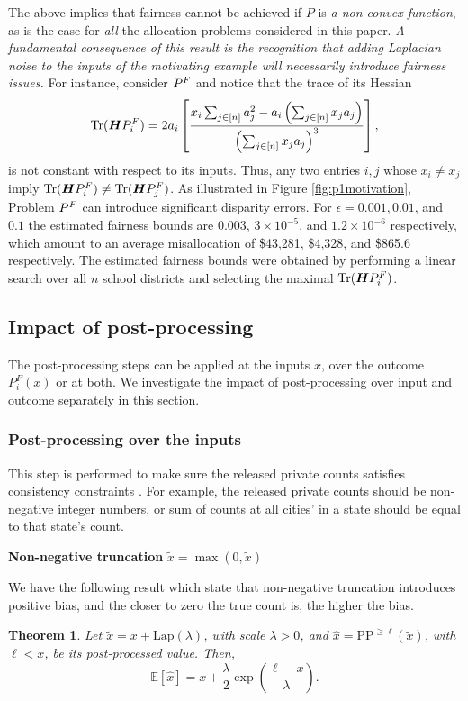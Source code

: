 \documentclass[9pt,twocolumn,twoside,lineno]{pnas-new}
\newcommand{\EE}{\mathbb{E}} \newcommand{\RR}{\mathbb{R}}
\newtheorem{theorem}{Theorem}
\begin{document}
\noindent
The above implies that fairness cannot be achieved if $P$ is \emph{a
  non-convex function}, as is the case for \emph{all} the allocation
problems considered in this paper. {\em A fundamental consequence of
  this result is the recognition that adding Laplacian noise to the
  inputs of the motivating example will necessarily introduce fairness
  issues.} For instance, consider $P^F$ and notice that the trace of
its Hessian
\[
\mbox{Tr}(\bm{H}P^F_i) = 2a_i \left[
\frac{x_i \sum_{j\in[n]} a_j^2 - a_i \left(\sum_{j\in[n]} x_ja_j\right)}
     {\left(\sum_{j\in[n]}x_ja_j\right)^3}
\right],
\]
is not constant with respect to its inputs. Thus, any two entries $i,
j$ whose $x_i \neq x_j$ imply $\mbox{Tr}(\bm{H}P^F_i) \neq
\mbox{Tr}(\bm{H}P^F_j)$.  As illustrated in Figure \ref{fig:p1motivation},
Problem $P^F$ can introduce significant disparity errors.  For $\epsilon = 0.001,
0.01$, and $0.1$ the estimated fairness bounds are $0.003$, $3\times
10^{-5}$, and $1.2\times 10^{-6}$ respectively, which amount to an
average misallocation of \$43,281, \$4,328, and \$865.6 respectively.
The estimated fairness bounds were obtained by performing a linear
search over all $n$ school districts and selecting the maximal
$\mbox{Tr}(\bm{H}P^F_i)$.


\subsection*{Impact of post-processing}
The post-processing steps can be applied at the inputs $x$, over the outcome $P^F_{i}(x)$ or at both. We investigate the impact of post-processing over input and outcome separately in this section.


\subsubsection*{Post-processing over the inputs}
This step is performed to make sure the released private counts satisfies consistency constraints \cite{cohen2021census}. For example, the released private counts should be non-negative integer numbers, or sum of counts at all cities' in a state should be equal to that state's count. 


\noindent \textbf{Non-negative truncation} $\tilde{x} = \max(0, \tilde{x}) $

We have the following result which state that non-negative truncation introduces positive bias, and the closer to zero the true count is, the higher the bias. 
\begin{theorem}
  \label{lem:exp_clipped_lap}
  Let $\tilde{x} = x + \mbox{Lap}(\lambda)$, with scale $\lambda > 0$, 
  and $\hat{x} = \text{PP}^{\geq \ell}(\tilde{x})$, with $\ell < x$, 
  be its post-processed value. Then, 
  $$ 
    \EE[\hat{x}] = x + \frac{\lambda}{2} \exp(\frac{\ell - x}{\lambda} ).
  $$
\end{theorem}
\end{document}
